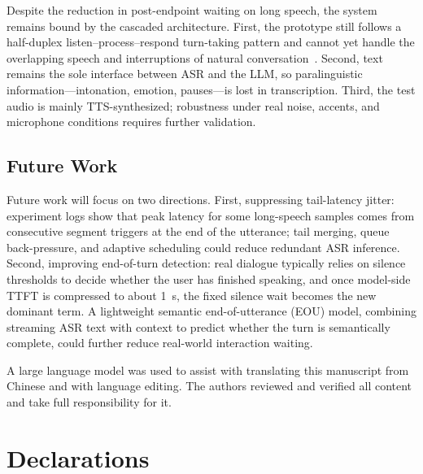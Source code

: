 \documentclass[pdflatex,iicol,Numbered,sn-basic]{sn-jnl}%
\begin{document}
Despite the reduction in post-endpoint waiting on long speech, the system remains bound by the cascaded architecture. First, the prototype still follows a half-duplex listen--process--respond turn-taking pattern and cannot yet handle the overlapping speech and interruptions of natural conversation~\cite{ref22}. Second, text remains the sole interface between ASR and the LLM, so paralinguistic information---intonation, emotion, pauses---is lost in transcription. Third, the test audio is mainly TTS-synthesized; robustness under real noise, accents, and microphone conditions requires further validation.

\subsection{Future Work}

Future work will focus on two directions. First, suppressing tail-latency jitter: experiment logs show that peak latency for some long-speech samples comes from consecutive segment triggers at the end of the utterance; tail merging, queue back-pressure, and adaptive scheduling could reduce redundant ASR inference. Second, improving end-of-turn detection: real dialogue typically relies on silence thresholds to decide whether the user has finished speaking, and once model-side TTFT is compressed to about 1~s, the fixed silence wait becomes the new dominant term. A lightweight semantic end-of-utterance (EOU) model, combining streaming ASR text with context to predict whether the turn is semantically complete, could further reduce real-world interaction waiting.

\backmatter


A large language model was used to assist with translating this manuscript from Chinese and with language editing. The authors reviewed and verified all content and take full responsibility for it.

\section*{Declarations}
\end{document}
